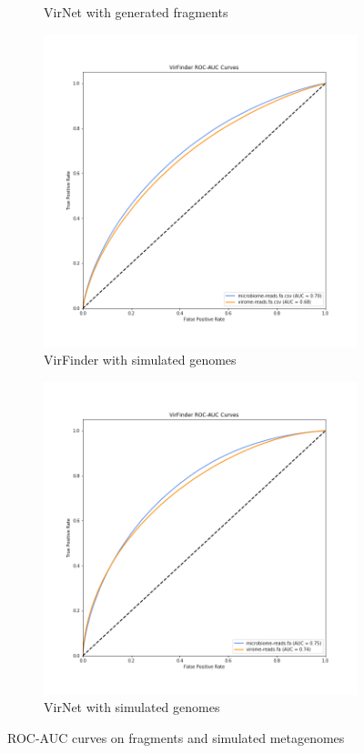 \documentclass[conference]{IEEEtran}
\begin{document}
\begin{figure}[!htbp]
\begin{subfigure}{0.3\textwidth}
	\caption{VirNet with generated fragments} 
	\label{fig:roc_auc_virneta}
\end{subfigure}
\begin{subfigure}{0.3\textwidth}
	\includegraphics[width=\linewidth]{imgs/roc_auc_simulated.png}
	\caption{VirFinder with simulated genomes} 
	\label{fig:roc_auc_virfinderb}
\end{subfigure}
\begin{subfigure}{0.3\textwidth}
	\includegraphics[width=\linewidth]{imgs/virnet_roc_auc_simulated.png}
	\caption{VirNet with simulated genomes} 
	\label{fig:roc_auc_virnetb}
\end{subfigure}
\caption{ROC-AUC curves on fragments and simulated metagenomes} 
\label{fig:roc_auc_virfinder}
\end{figure}
\end{document}
